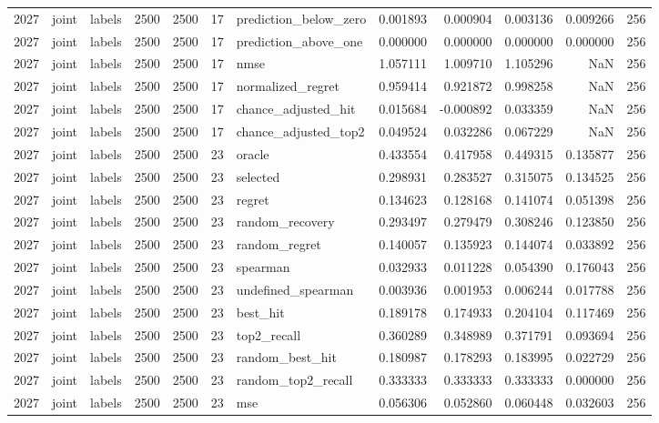 \begin{tabular}{rllrrrlrrrrr}
2027 & joint & labels & 2500 & 2500 & 17 & prediction_below_zero & 0.001893 & 0.000904 & 0.003136 & 0.009266 & 256 \\
2027 & joint & labels & 2500 & 2500 & 17 & prediction_above_one & 0.000000 & 0.000000 & 0.000000 & 0.000000 & 256 \\
2027 & joint & labels & 2500 & 2500 & 17 & nmse & 1.057111 & 1.009710 & 1.105296 & NaN & 256 \\
2027 & joint & labels & 2500 & 2500 & 17 & normalized_regret & 0.959414 & 0.921872 & 0.998258 & NaN & 256 \\
2027 & joint & labels & 2500 & 2500 & 17 & chance_adjusted_hit & 0.015684 & -0.000892 & 0.033359 & NaN & 256 \\
2027 & joint & labels & 2500 & 2500 & 17 & chance_adjusted_top2 & 0.049524 & 0.032286 & 0.067229 & NaN & 256 \\
2027 & joint & labels & 2500 & 2500 & 23 & oracle & 0.433554 & 0.417958 & 0.449315 & 0.135877 & 256 \\
2027 & joint & labels & 2500 & 2500 & 23 & selected & 0.298931 & 0.283527 & 0.315075 & 0.134525 & 256 \\
2027 & joint & labels & 2500 & 2500 & 23 & regret & 0.134623 & 0.128168 & 0.141074 & 0.051398 & 256 \\
2027 & joint & labels & 2500 & 2500 & 23 & random_recovery & 0.293497 & 0.279479 & 0.308246 & 0.123850 & 256 \\
2027 & joint & labels & 2500 & 2500 & 23 & random_regret & 0.140057 & 0.135923 & 0.144074 & 0.033892 & 256 \\
2027 & joint & labels & 2500 & 2500 & 23 & spearman & 0.032933 & 0.011228 & 0.054390 & 0.176043 & 256 \\
2027 & joint & labels & 2500 & 2500 & 23 & undefined_spearman & 0.003936 & 0.001953 & 0.006244 & 0.017788 & 256 \\
2027 & joint & labels & 2500 & 2500 & 23 & best_hit & 0.189178 & 0.174933 & 0.204104 & 0.117469 & 256 \\
2027 & joint & labels & 2500 & 2500 & 23 & top2_recall & 0.360289 & 0.348989 & 0.371791 & 0.093694 & 256 \\
2027 & joint & labels & 2500 & 2500 & 23 & random_best_hit & 0.180987 & 0.178293 & 0.183995 & 0.022729 & 256 \\
2027 & joint & labels & 2500 & 2500 & 23 & random_top2_recall & 0.333333 & 0.333333 & 0.333333 & 0.000000 & 256 \\
2027 & joint & labels & 2500 & 2500 & 23 & mse & 0.056306 & 0.052860 & 0.060448 & 0.032603 & 256 \\

\end{tabular}
